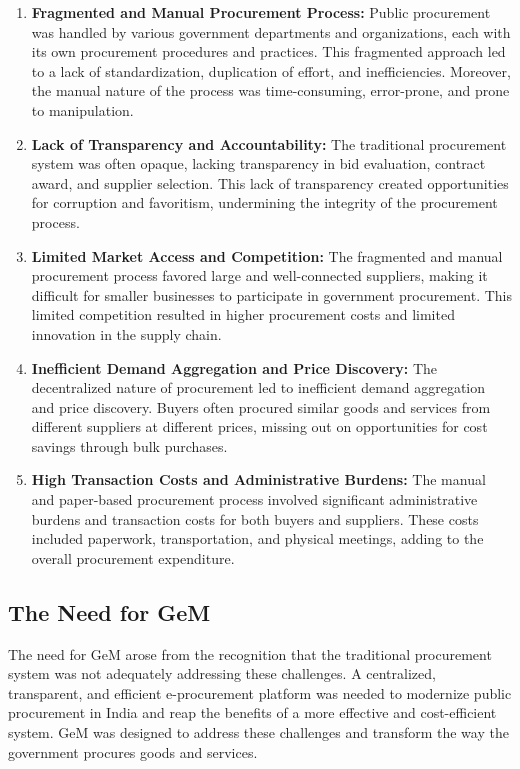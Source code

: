 \begin{enumerate}
    \item \textbf{Fragmented and Manual Procurement Process:} Public procurement was handled by various government departments and organizations, each with its own procurement procedures and practices. This fragmented approach led to a lack of standardization, duplication of effort, and inefficiencies. Moreover, the manual nature of the process was time-consuming, error-prone, and prone to manipulation.
    
    \item \textbf{Lack of Transparency and Accountability:} The traditional procurement system was often opaque, lacking transparency in bid evaluation, contract award, and supplier selection. This lack of transparency created opportunities for corruption and favoritism, undermining the integrity of the procurement process.
    
    \item \textbf{Limited Market Access and Competition:} The fragmented and manual procurement process favored large and well-connected suppliers, making it difficult for smaller businesses to participate in government procurement. This limited competition resulted in higher procurement costs and limited innovation in the supply chain.
    
    \item \textbf{Inefficient Demand Aggregation and Price Discovery:} The decentralized nature of procurement led to inefficient demand aggregation and price discovery. Buyers often procured similar goods and services from different suppliers at different prices, missing out on opportunities for cost savings through bulk purchases.
    
    \item \textbf{High Transaction Costs and Administrative Burdens:} The manual and paper-based procurement process involved significant administrative burdens and transaction costs for both buyers and suppliers. These costs included paperwork, transportation, and physical meetings, adding to the overall procurement expenditure.
\end{enumerate}

\subsection{The Need for GeM}

The need for GeM arose from the recognition that the traditional procurement system was not adequately addressing these challenges. A centralized, transparent, and efficient e-procurement platform was needed to modernize public procurement in India and reap the benefits of a more effective and cost-efficient system. GeM was designed to address these challenges and transform the way the government procures goods and services.


